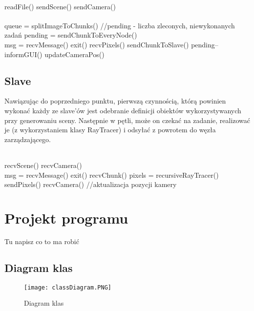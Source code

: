 \begin{algorithmic}
\\
\State readFile()
\State sendScene()
\State sendCamera()
\\
\\
\State queue = splitImageToChunks()
\State //pending - liczba zleconych, niewykonanych zadań
\State pending = sendChunkToEveryNode()
\\
\State msg = recvMessage()
 exit()
	recvPixels()
		sendChunkToSlave()
	\Else
		pending--
	\EndIf
\EndIf
\EndWhile
\State informGUI()
\State updateCameraPos()
\EndWhile

\end{algorithmic}


\subsection{Slave}

Nawiązując do poprzedniego punktu, pierwszą czynnością, którą powinien wykonać każdy ze slave'ów jest odebranie definicji obiektów wykorzystywanych przy generowaniu sceny. Następnie w pętli, może on czekać na zadanie, realizować je (z wykorzystaniem klasy RayTracer) i odsyłać z powrotem do węzła zarządzającego.

\begin{algorithmic}
\\
\State recvScene()
\State recvCamera()
\\
\State msg = recvMessage()
 exit()
	recvChunk()
	pixels = recursiveRayTracer()
	sendPixels()
	recvCamera() //aktualizacja pozycji kamery
\EndIf
\EndWhile

\end{algorithmic}



\section{Projekt programu}

	Tu napisz co to ma robić
	
	\subsection{Diagram klas}
	\begin{figure}[H]
    \centering
              \texttt{[image: classDiagram.PNG]}
    \caption{Diagram klas}
    \label{fig:classDiagram}
	\end{figure}
	
